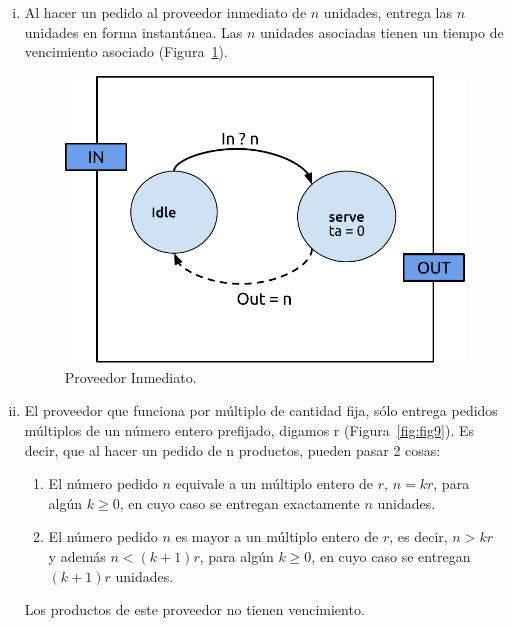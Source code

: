 \documentclass[10pt]{article}
\begin{document}
\begin{enumerate}[i)]
\item Al hacer un pedido al proveedor inmediato de $n$ unidades, entrega las $n$ unidades en forma instantánea. Las $n$ unidades asociadas tienen un tiempo de vencimiento asociado (Figura~\ref{fig:fig8}).

\begin{figure}
\centering
\includegraphics[scale=0.8]{img/figura8}
\caption{Proveedor Inmediato.}
\label{fig:fig8}
\end{figure}

\item El proveedor que funciona por múltiplo de cantidad fija, sólo entrega pedidos múltiplos de un número entero prefijado, digamos r (Figura~\ref{fig:fig9}). Es decir, que al hacer un pedido de n productos, pueden pasar 2 cosas:

\begin{enumerate}[1)]
\item El número pedido $n$ equivale a un múltiplo entero de $r$, $n = k r$, para algún $k \geq 0$, en cuyo caso se entregan exactamente $n$ unidades.
\item El número pedido $n$ es mayor a un múltiplo entero de $r$, es decir, $n > k r$ y además $n < (k+1)r$, para algún $k \geq 0$, en cuyo caso se entregan $(k+1)r$ unidades.
\end{enumerate}

Los productos de este proveedor no tienen vencimiento.


\end{enumerate}
\end{document}
